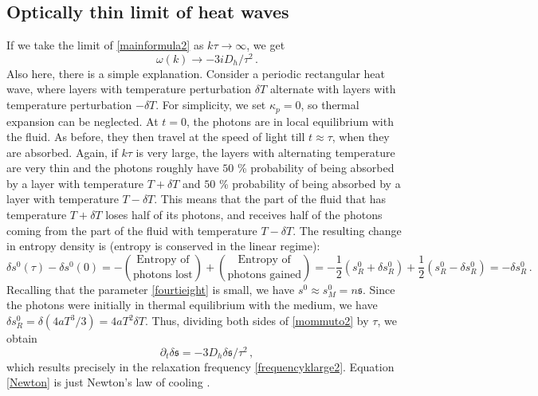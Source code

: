 \documentclass[a4paper, amsfonts, amssymb, amsmath, reprint, showkeys, nofootinbib, twoside,notitlepage,onecolumn]{revtex4-2}
\theoremstyle{definition}
\theoremstyle{theorem}
\theoremstyle{corollary}
\begin{document}
\subsection{Optically thin limit of heat waves}



If we take the limit of \eqref{mainformula2} as $k\tau \rightarrow \infty$, we get
\begin{equation}\label{frequencyklarge2}
\omega(k) \longrightarrow -3iD_h/\tau^2 \, .
\end{equation}
Also here, there is a simple explanation. Consider a periodic rectangular heat wave, where layers with temperature perturbation $\delta T$ alternate with layers with temperature perturbation $-\delta T$. For simplicity, we set $\kappa_p = 0$, so thermal expansion can be neglected. At $t=0$, the photons are in local equilibrium with the fluid. As before, they then travel at the speed of light till $t \approx \tau$, when they are absorbed. Again, if $k\tau$ is very large, the layers with alternating temperature are very thin and the photons roughly have $50$ \% probability of being absorbed by a layer with temperature $T+\delta T$ and $50$ \% probability of being absorbed by a layer with temperature $T{-}\delta T$. This means that the part of the fluid that has temperature $T{+}\delta T$ loses half of its photons, and receives half of the photons coming from the part of the fluid with temperature $T{-}\delta T$. The resulting change in entropy density is (entropy is conserved in the linear regime):
\begin{equation}\label{mommuto2}
\delta s^{0}(\tau){-}\delta s^{0}(0) =- \binom{\text{Entropy of}}{\text{photons lost}} + \binom{\text{Entropy of}}{\text{photons gained}} = -\dfrac{1}{2} (s_R^0+\delta s_R^{0}) + \dfrac{1}{2} (s_R^0-\delta s_R^{0}) = -\delta s_R^{0} \, .
\end{equation}
Recalling that the parameter \eqref{fourtieight} is small, we have $s^{0} \approx s_M^{0}=n \mathfrak{s}$. Since the photons were initially in thermal equilibrium with the medium, we have $\delta s_R^{0}=\delta (4aT^3/3)=4aT^2 \delta T$. Thus, dividing both sides of \eqref{mommuto2} by $\tau$, we obtain
\begin{equation}\label{Newton}
\partial_t \delta \mathfrak{s}=- 3 D_h \delta \mathfrak{s}/\tau^2 \, ,
\end{equation}
which results precisely in the relaxation frequency \eqref{frequencyklarge2}. Equation \eqref{Newton} is just Newton's law of cooling \cite[\S 100]{mihalas_book}.
\end{document}
